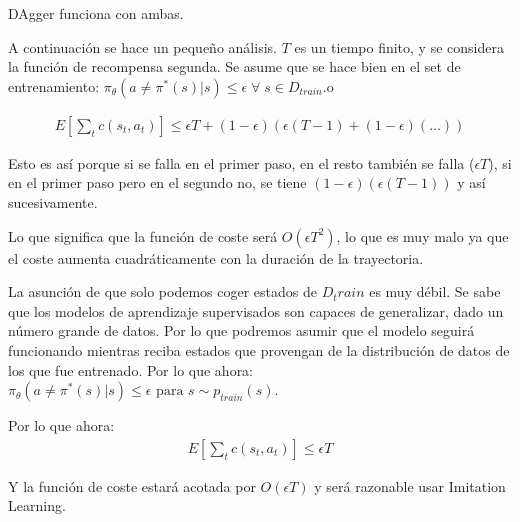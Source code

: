 DAgger funciona con ambas.

A continuación se hace un pequeño análisis. $T$ es un tiempo finito, y se considera la función
de recompensa segunda. Se asume que se hace bien en el set de entrenamiento: $\pi_\theta (a \neq
\pi^*(s)|s) \leq \epsilon \;\forall\; s \in D_{train}$.o

\begin{align}
    E\left[\sum_t c(s_t, a_t)\right] \leq \epsilon T +
    (1-\epsilon)(\epsilon(T-1)+(1-\epsilon)(\ldots))
\end{align}

Esto es así porque si se falla en el primer paso, en el resto también se falla ($\epsilon
T$), si en el primer paso pero en el segundo no, se tiene
$(1-\epsilon)(\epsilon(T-1))$ y así sucesivamente.

Lo que significa que la función de coste será $O(\epsilon T^2)$, lo que es muy malo ya que el
coste aumenta cuadráticamente con la duración de la trayectoria.

La asunción de que solo podemos coger estados de  $D_train$ es muy débil. Se sabe que los
modelos de aprendizaje supervisados son capaces de generalizar, dado un número grande de
datos. Por lo que podremos asumir que el modelo seguirá funcionando mientras reciba estados que
provengan de la distribución de datos de los que fue entrenado. Por lo que ahora: $\pi_\theta (a
\neq \pi^*(s)|s) \leq \epsilon \textrm{ para } s \sim p_{train}(s)$.

Por lo que ahora:
\begin{align}
    E\left[\sum_t c(s_t, a_t)\right] \leq \epsilon T
\end{align}

Y la función de coste estará acotada por $O(\epsilon T)$ y será razonable usar Imitation
Learning.
